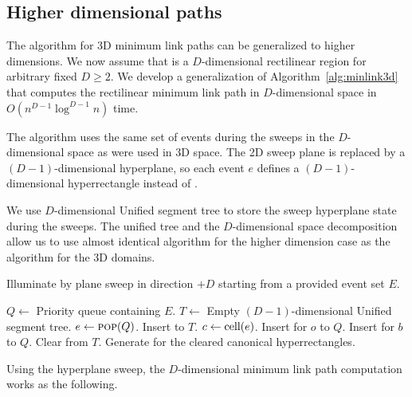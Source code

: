 \documentclass[english,gradu]{tktltiki2018}
\begin{document}
\subsection{Higher dimensional paths}

The algorithm for 3D minimum link paths can be generalized to higher dimensions.
We now assume that \fspace is a $D$-dimensional rectilinear region for arbitrary fixed $D\ge 2$.
We develop a generalization of Algorithm~\ref{alg:minlink3d} that computes the rectilinear minimum link path in $D$-dimensional space in $O(n^{D-1}\log^{D-1}n)$ time.

The algorithm uses the same set of events during the sweeps in the $D$-dimensional space as were used in 3D space.
The 2D sweep plane is replaced by a $(D-1)$-dimensional hyperplane, so each event $e$ defines a $(D-1)$-dimensional hyperrectangle  instead of .

We use $D$-dimensional Unified segment tree to store the sweep hyperplane state during the sweeps.
The unified tree and the $D$-dimensional space decomposition allow us to use almost identical algorithm for the higher dimension case as the algorithm for the 3D domains.

\begin{alg}\label{alg:sweepdd}
Illuminate by plane sweep in direction $+D$ starting from a provided event set $E$.
\begin{algorithmic}
\State $Q\gets$ Priority queue containing $E$.
\State $T\gets$ Empty $(D-1)$-dimensional Unified segment tree.
	\State $e\gets\textsc{pop}(Q)$.
		\State Insert  to $T$.
			\State $c\gets\text{cell}(e)$.
				\State Insert \obsE for $o$ to $Q$.
			\EndFor
				\State Insert \cellE for $b$ to $Q$.
			\EndFor
		\EndIf
		\State Clear  from $T$.
		\State Generate \addEs for the cleared canonical hyperrectangles.
	\EndIf
\EndWhile
\end{algorithmic}
\end{alg}

Using the hyperplane sweep, the $D$-dimensional minimum link path computation works as the following.
\end{document}

